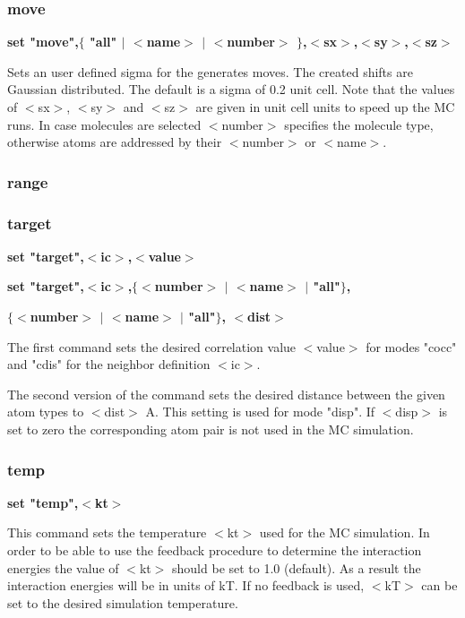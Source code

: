 \subsubsection{move}
{\bf set "move",$ \{$ "all" $| $ $ <$name$> $ $| $ $ <$number$> $ $\} $,$ <$sx$> $,$ <$sy$> $,$ <$sz$> $ \par }
\par
\vspace{3pt}
Sets an user defined sigma for the generates moves. The created shifts 
are Gaussian distributed. The default is a sigma of 0.2 unit cell. Note 
that the values of $ <$sx$> $, $ <$sy$> $ and $ <$sz$> $ are given in unit cell units to 
speed up the MC runs. In case molecules are selected $ <$number$> $ specifies 
the molecule type, otherwise atoms are addressed by their $ <$number$> $ or 
$ <$name$> $. 
\subsubsection{range}
\subsubsection{target}
{\bf set "target",$ <$ic$> $,$ <$value$> $ \par }
{\bf set "target",$ <$ic$> $,$ \{$$ <$number$> $ $| $ $ <$name$> $ $| $ "all"$\} $, \par }
{\bf                   $ \{$$ <$number$> $ $| $ $ <$name$> $ $| $ "all"$\} $, $ <$dist$> $ \par }
\par
\vspace{3pt}
The first  command sets the desired correlation value $ <$value$> $ for 
modes "cocc" and "cdis" for the neighbor definition $ <$ic$> $. 
\par
The second version of the command sets the desired distance 
between the given atom types to $ <$dist$> $ A. This setting is used 
for mode "disp". If $ <$disp$> $ is set to zero the corresponding 
atom pair is not used in the MC simulation. 
\subsubsection{temp}
{\bf set "temp",$ <$kt$> $ \par }
\par
\vspace{3pt}
This command sets the temperature $ <$kt$> $ used for the MC simulation. 
In order to be able to use the feedback procedure to determine the 
interaction energies the value of $ <$kt$> $ should be set to 1.0 (default). 
As a result the interaction energies will be in units of kT. If no 
feedback is used, $ <$kT$> $ can be set to the desired simulation temperature. 

